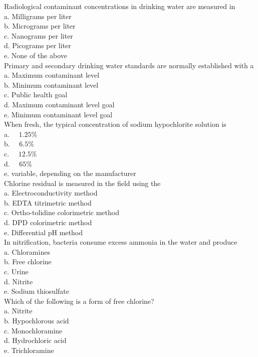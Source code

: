Radiological contaminant concentrations in drinking water are measured in\\
a. Milligrams per liter\\
b. Micrograms per liter\\
c. Nanograms per liter\\
d. Picograms per liter\\
e. None of the above\\

Primary and secondary drinking water standards are normally established with a\\
a. Maximum contaminant level\\
b. Minimum contaminant level\\
c. Public health goal\\
d. Maximum contaminant level goal\\
e. Minimum contaminant level goal\\

When fresh, the typical concentration of sodium hypochlorite solution is\\
a. $\quad 1.25 \%$\\
b. $\quad 6.5 \%$\\
c. $\quad 12.5 \%$\\
d. $\quad 65 \%$\\
e. variable, depending on the manufacturer\\

Chlorine residual is measured in the field using the\\
a. Electroconductivity method\\
b. EDTA titrimetric method\\
c. Ortho-tolidine colorimetric method\\
d. DPD colorimetric method\\
e. Differential $\mathrm{pH}$ method\\

In nitrification, bacteria consume excess ammonia in the water and produce\\
a. Chloramines\\
b. Free chlorine\\
c. Urine\\
d. Nitrite\\
e. Sodium thiosulfate\\

Which of the following is a form of free chlorine?\\
a. Nitrite\\
b. Hypochlorous acid\\
c. Monochloramine\\
d. Hydrochloric acid\\
e. Trichloramine\\

